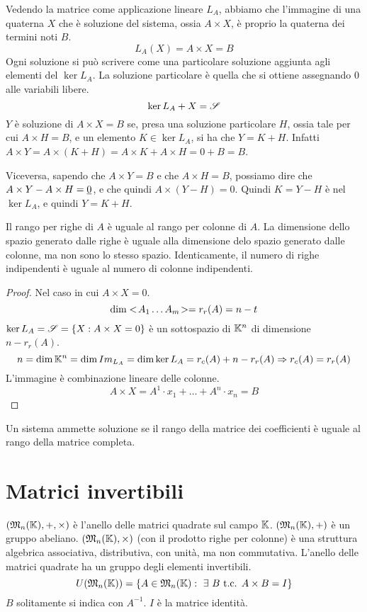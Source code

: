 Vedendo la matrice come applicazione lineare $L_A$, abbiamo che l'immagine di una quaterna $X$ che \`e soluzione del sistema, ossia $A \times X$, \`e proprio la quaterna dei termini noti $B$.
\[
L_A(X) = A \times X = B
\]
Ogni soluzione si pu\`o scrivere come una particolare soluzione aggiunta agli elementi del $\ker L_A$. La soluzione particolare \`e quella che si ottiene assegnando 0 alle variabili libere.
\[
\ker L_A + X = \mathscr{S}
\]
$Y$ \`e soluzione di $A \times X = B$ se, presa una soluzione particolare $H$, ossia tale per cui $A \times H = B$, e un elemento $K \in \ker L_A$, si ha che $Y = K + H$. Infatti $A \times Y = A \times (K + H) = A \times K + A \times H = 0 + B = B$.

Viceversa, sapendo che $A \times Y = B$ e che $A \times H = B$, possiamo dire che $A \times Y - A \times H = \underline{0}$, e che quindi $A \times (Y - H) = 0$. Quindi $K = Y - H$ \`e nel $\ker L_A$, e quindi $Y = K + H$.

Il rango per righe di $A$ \`e uguale al rango per colonne di $A$. La dimensione dello spazio generato dalle righe \`e uguale alla dimensione delo spazio generato dalle colonne, ma non sono lo stesso spazio. Identicamente, il numero di righe indipendenti \`e uguale al numero di colonne indipendenti.

\begin{proof}
Nel caso in cui $A \times X = 0$.
\[
\dim <\!{A_1 \ldots A_m}\!> = r_r(A) = n - t
\]
$\ker L_A = \mathscr{S} = \{ X : A \times X = 0 \}$ \`e un sottospazio di $\mathbb{K}^n$ di dimensione $n - r_r(A)$.
\[
n = \dim \mathbb{K}^n = \dim Im_{L_A} = \dim \ker L_A = r_c (A) + n - r_r(A) \Rightarrow r_c(A) = r_r(A)
\]
L'immagine \`e combinazione lineare delle colonne.
\[
A \times X = A^1 \cdot x_1 + \ldots + A^n \cdot x_n = B
\]
\end{proof}

\begin{theorem}
Un sistema ammette soluzione se il rango della matrice dei coefficienti \`e uguale al rango della matrice completa.
\end{theorem}

\section{Matrici invertibili}

$(\mathfrak{M}_n (\mathbb{K}), +, \times)$ \`e l'anello delle matrici quadrate sul campo $\mathbb{K}$. $(\mathfrak{M}_n (\mathbb{K}), +)$ \`e un gruppo abeliano. $(\mathfrak{M}_n (\mathbb{K}), \times)$ (con il prodotto righe per colonne) \`e una struttura algebrica associativa, distributiva, con unit\`a, ma non commutativa. L'anello delle matrici quadrate ha un gruppo degli elementi invertibili.
\[
U(\matrices_n (\field)) = \{ A \in \matrices_n (\field) : \exists B \text{ t.c. } A \times B = I \}
\]
$B$ solitamente si indica con $A^{-1}$. $I$ \`e la matrice identit\`a.

